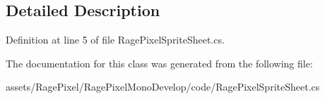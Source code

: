 \subsection{Detailed Description}


Definition at line 5 of file Rage\-Pixel\-Sprite\-Sheet.\-cs.



The documentation for this class was generated from the following file\-:\begin{DoxyCompactItemize}
\item 
assets/\-Rage\-Pixel/\-Rage\-Pixel\-Mono\-Develop/code/Rage\-Pixel\-Sprite\-Sheet.\-cs\end{DoxyCompactItemize}
